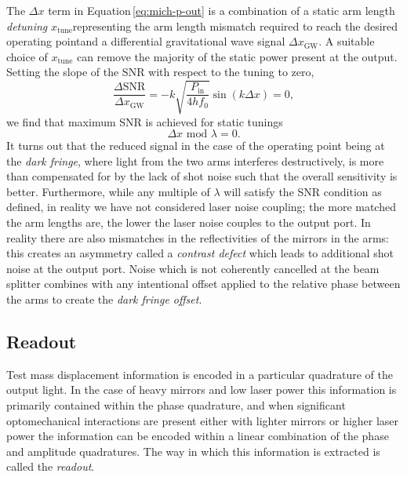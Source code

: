 The $\Delta x$ term in Equation\,\ref{eq:mich-p-out} is a combination of a static arm length \emph{detuning} $x_{\text{tune}}$\textemdash representing the arm length mismatch required to reach the desired operating point\textemdash and a differential gravitational wave signal $\Delta x_{\text{GW}}$. A suitable choice of $x_{\text{tune}}$ can remove the majority of the static power present at the output. Setting the slope of the \gls{SNR} with respect to the tuning to zero,
\begin{equation}
  \frac{\Delta \text{SNR}}{\Delta x_{\text{GW}}} = -k \sqrt{\frac{P_{\text{in}}}{4 h f_0}} \sin \left(k \Delta x\right) = 0,
\end{equation}
we find that maximum \gls{SNR} is achieved for static tunings 
\begin{equation}
  \Delta x \text{ mod } \lambda = 0.
\end{equation}
It turns out that the reduced signal in the case of the operating point being at the \emph{dark fringe}, where light from the two arms interferes destructively, is more than compensated for by the lack of shot noise such that the overall sensitivity is better. Furthermore, while any multiple of $\lambda$ will satisfy the \gls{SNR} condition as defined, in reality we have not considered laser noise coupling; the more matched the arm lengths are, the lower the laser noise couples to the output port. In reality there are also mismatches in the reflectivities of the mirrors in the arms: this creates an asymmetry called a \emph{contrast defect} which leads to additional shot noise at the output port. Noise which is not coherently cancelled at the beam splitter combines with any intentional offset applied to the relative phase between the arms to create the \emph{dark fringe offset}.

\subsection{\label{sec:readout}Readout}

Test mass displacement information is encoded in a particular quadrature of the output light. In the case of heavy mirrors and low laser power this information is primarily contained within the phase quadrature, and when significant optomechanical interactions are present either with lighter mirrors or higher laser power the information can be encoded within a linear combination of the phase and amplitude quadratures. The way in which this information is extracted is called the \emph{readout}.


